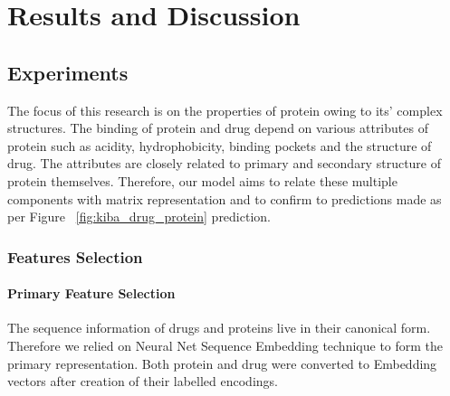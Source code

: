 \chapter{Results and Discussion}


\section{Experiments}

The focus of this research is on the properties of protein owing to its' complex structures. The binding of protein and drug depend on various attributes of protein such as acidity, hydrophobicity, binding pockets and the structure of drug. The attributes are closely related to primary and secondary structure of protein themselves. Therefore, our model aims to relate these multiple components with matrix representation and to confirm to predictions made as per Figure ~\ref{fig:kiba_drug_protein} prediction.

\subsection{Features Selection}
\subsubsection{Primary Feature Selection}
The sequence information of drugs and proteins live in their canonical form. 
Therefore we relied on Neural Net Sequence Embedding technique to form the primary representation. Both protein and drug were converted to Embedding vectors after creation of their labelled encodings. 

